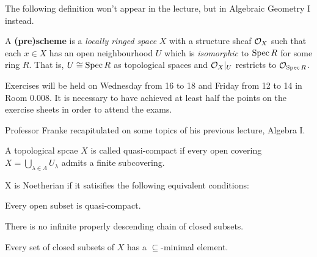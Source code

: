 \documentclass[a4paper,parskip=full,numbers=enddot]{scrreprt}
\begin{document}
The following definition won't appear in the lecture, but in Algebraic Geometry I instead.
\begin{defi} 
    A \textbf{(pre)scheme} is a \emph{locally ringed space} $X$ with a structure sheaf $\mathcal{O}_X$ such that each $x\in X$ has an open neighbourhood $U$ which is \emph{isomorphic} to $\operatorname{Spec} R$ for some ring $R$. That is, $U\cong \operatorname{Spec} R$ as topological spaces and $\mathcal{O}_X|_U$ restricts to $\mathcal{O}_{\operatorname{Spec} R}$.
\end{defi}

Exercises will be held on Wednesday from 16 to 18 and Friday from 12 to 14 in Room 0.008. It is necessary to have achieved at least half the points on the exercise sheets in order to attend the exams.

Professor Franke recapitulated on some topics of his previous lecture, Algebra I.
\begin{defi}
 A topological spcae $X$ is called quasi-compact if every open covering $X = \bigcup_{\lambda\in\Lambda} U_\lambda$ admits a finite subcovering.
 
 X is Noetherian if it satisifies the following equivalent conditions:
 \begin{alphanumerate}
    \item Every open subset is quasi-compact.
    \item There is no infinite properly descending chain of closed subsets.
    \item Every set of closed subsets of $X$ has a $\subseteq$-minimal element.
 \end{alphanumerate}

\end{defi}
\end{document}
